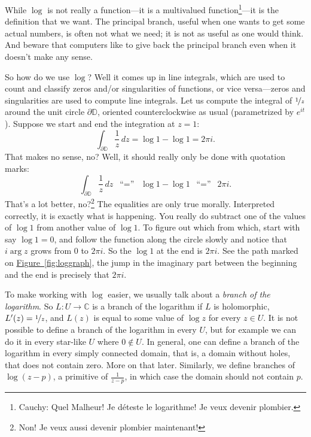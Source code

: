 \documentclass[12pt,openany]{book}
\newcommand{\C}{{\mathbb{C}}}
\newcommand{\D}{{\mathbb{D}}}
\newcommand{\myindex}[1]{#1\index{#1}}
\theoremstyle{plain}
\theoremstyle{remark}
\theoremstyle{definition}
\theoremstyle{exercise}
\theoremstyle{example}
\newcommand{\figureref}[1]{\hyperref[#1]{Figure~\ref*{#1}}}
\begin{document}
While $\log$ is not really a function---it is a multivalued
function\footnote{%
Cauchy: Quel Malheur!  Je d{\'e}teste le logarithme! Je veux devenir plombier.}---it is
the definition that we want.
The principal branch,
useful when one wants to get some actual numbers, is often not what we
need; it is not as useful as one would think.
And beware that computers like to give back the principal branch even 
when it doesn't make any sense.

So how do we use $\log$?  Well it comes up in line integrals, which are used
to count and classify zeros and/or singularities of functions, or vice
versa---zeros and singularities are used to compute line integrals.
Let us compute the integral of $\nicefrac{1}{z}$ around the unit
circle $\partial \D$, oriented counterclockwise as usual (parametrized
by $e^{it}$).  Suppose we start and end the integration at 
$z=1$:
\begin{equation*}
\int_{\partial \D} \frac{1}{z} \, dz
= \log 1 - \log 1 = 2\pi i.
\end{equation*}
That makes no sense, no?  Well, it should really only be done
with quotation marks:
\begin{equation*}
\int_{\partial \D} \frac{1}{z} \, dz
\enspace
\text{``$=$''}
\enspace
\log 1 - \log 1
\enspace
\text{``$=$''}
\enspace
2\pi i.
\end{equation*}
That's a lot better,
no?\footnote{Non! Je veux aussi devenir plombier maintenant!}
The equalities are only true morally.
Interpreted correctly, it is exactly what is happening.  You really do subtract
one of the values of $\log 1$ from another value of $\log 1$.  To figure
out which from which, start with say $\log 1 = 0$, and follow the
function along the circle slowly and notice that $i \arg z$ grows from $0$ to
$2\pi i$.  So the $\log 1$ at the end is $2 \pi i$.  See the path
marked on \figureref{fig:loggraph}, the jump in the imaginary part between
the beginning and the end is precisely that $2\pi i$.

To make working with $\log$ easier, we usually talk about a
\emph{\myindex{branch of the logarithm}}.  So $L \colon U \to \C$ is a branch
of the logarithm if $L$ is holomorphic, $L'(z) = \nicefrac{1}{z}$, and $L(z)$ is equal
to some value of $\log z$ for every $z \in U$.  It is not possible to define
a branch of the logarithm in every $U$, but for example we can do it in every
star-like $U$ where $0 \notin U$.  In general, one can define a branch of
the logarithm in every simply connected domain, that is, a domain without holes,
that does not contain zero.
More on that later.  Similarly, we define branches of $\log (z-p)$,
a primitive of $\frac{1}{z-p}$, in which case the domain
should not contain $p$.
\end{document}
